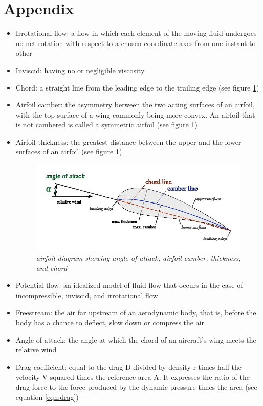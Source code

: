 \documentclass{journal}
\begin{document}
	\newpage
	
	\section{Appendix}
	
	\begin{itemize}
		\item Irrotational flow: a flow in which each element of the moving fluid undergoes no net rotation with respect to a chosen coordinate axes from one instant to other
		\item Inviscid: having no or negligible viscosity
		\item Chord: a straight line from the leading edge to the trailing edge (see figure \ref{fig:airfoil-diagram})
		\item Airfoil camber: the asymmetry between the two acting surfaces of an airfoil, with the top surface of a wing commonly being more convex. An airfoil that is not cambered is called a symmetric airfoil (see figure \ref{fig:airfoil-diagram})
		\item Airfoil thickness: the greatest distance between the upper and the lower surfaces of an airfoil (see figure \ref{fig:airfoil-diagram})
		
		\begin{figure}[H]
			\centering
			\includegraphics[scale=0.4]{../graphics/airfoil-diagram.jpg}
			\caption{\emph{airfoil diagram showing angle of attack, airfoil camber, thickness, and chord}}
			\label{fig:airfoil-diagram}
		\end{figure}
		
		\item Potential flow: an idealized model of fluid flow that occurs in the case of incompressible, inviscid, and irrotational flow
		\item Freestream: the air far upstream of an aerodynamic body, that is, before the body has a chance to deflect, slow down or compress the air
		\item Angle of attack: the angle at which the chord of an aircraft's wing meets the relative wind
		\item Drag coefficient: equal to the drag D divided by density r times half the velocity V squared times the reference area A. It expresses the ratio of the drag force to the force produced by the dynamic pressure times the area (see equation \ref{eqn:drag})
		

\end{itemize}
\end{document}
